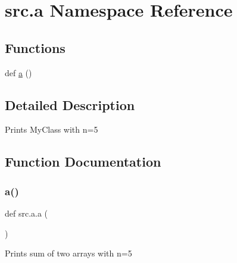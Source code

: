 \hypertarget{namespacesrc_1_1a}{}\section{src.\+a Namespace Reference}
\label{namespacesrc_1_1a}
\subsection*{Functions}
\begin{DoxyCompactItemize}
\item 
def \hyperlink{namespacesrc_1_1a_ab6ca8696e646cc990881db753c957101}{a} ()
\end{DoxyCompactItemize}


\subsection{Detailed Description}
\begin{DoxyVerb}Prints MyClass with n=5
\end{DoxyVerb}
 

\subsection{Function Documentation}
\mbox{\label{namespacesrc_1_1a_ab6ca8696e646cc990881db753c957101}} 
\subsubsection{\texorpdfstring{a()}{a()}}
{\footnotesize\ttfamily def src.\+a.\+a (\begin{DoxyParamCaption}{ }\end{DoxyParamCaption})}

\begin{DoxyVerb}Prints sum of two arrays with n=5
\end{DoxyVerb}
 